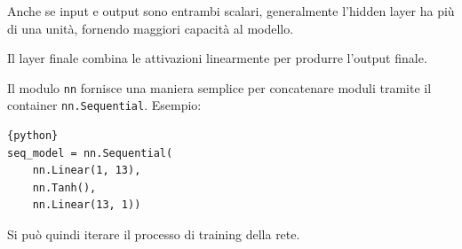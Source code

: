 Anche se input e output sono entrambi scalari, generalmente l'hidden layer ha più di una unità, fornendo maggiori capacità al modello.

Il layer finale combina le attivazioni linearmente per produrre l'output finale.

Il modulo \texttt{nn} fornisce una maniera semplice per concatenare moduli tramite il container \texttt{nn.Sequential}. Esempio: 
\begin{lstlisting}{python}
seq_model = nn.Sequential(
    nn.Linear(1, 13),
    nn.Tanh(),
    nn.Linear(13, 1))
\end{lstlisting}

Si può quindi iterare il processo di training della rete.